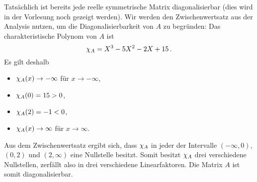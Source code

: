Tatsächlich ist bereits jede reelle symmetrische Matrix diagonalisierbar (dies wird in der Vorlesung noch gezeigt werden).
Wir werden den Zwischenwertsatz aus der Analysis nutzen, um die Diagonalisierbarkeit von $A$ zu begründen:
Das charakteristische Polynom von $A$ ist
\[
    \chi_{A}
  = X^3 - 5 X^2 - 2 X + 15 \,.
\]
Es gilt deshalb
\begin{itemize}
  \item
    $\chi_{A}(x) \to -\infty$ für $x \to -\infty$,
  \item
    $\chi_{A}(0) = 15 > 0$,
  \item
    $\chi_{A}(2) = -1 < 0$,
  \item
    $\chi_{A}(x) \to \infty$ für $x \to \infty$.
\end{itemize}
Aus dem Zwischenwertsatz ergibt sich, dass $\chi_{A}$ in jeder der Intervalle $(-\infty,0)$, $(0, 2)$ und $(2,\infty)$ eine Nullstelle besitzt.
Somit besitzt $\chi_{A}$ drei verschiedene Nullstellen, zerfällt also in drei verschiedene Linearfaktoren.
Die Matrix $A$ ist somit diagonalisierbar.







